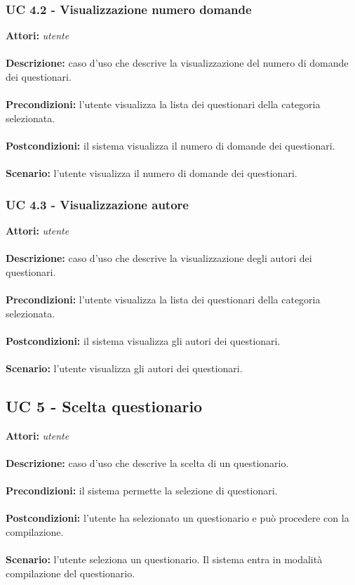 \documentclass[a4paper,11pt]{article}
\begin{document}
\subsubsection{UC 4.2 - Visualizzazione numero domande}

\textbf{Attori:} \textit{utente}
\\ \\
\textbf{Descrizione:} caso d'uso che descrive la visualizzazione del numero di domande dei questionari.\\
\\
\textbf{Precondizioni:} l'utente visualizza la lista dei questionari della categoria selezionata.\\
\\
\textbf{Postcondizioni:} il sistema visualizza il numero di domande dei questionari.\\
\\
\textbf{Scenario:} l’utente visualizza il numero di domande dei questionari.\\


\subsubsection{UC 4.3 - Visualizzazione autore}

\textbf{Attori:} \textit{utente}
\\ \\
\textbf{Descrizione:} caso d'uso che descrive la visualizzazione degli autori dei questionari.\\
\\
\textbf{Precondizioni:} l'utente visualizza la lista dei questionari della categoria selezionata.\\
\\
\textbf{Postcondizioni:} il sistema visualizza gli autori dei questionari.\\
\\
\textbf{Scenario:} l’utente visualizza gli autori dei questionari.\\


\subsection{UC 5 - Scelta questionario}

\textbf{Attori:} \textit{utente}
\\ \\
\textbf{Descrizione:} caso d'uso che descrive la scelta di un questionario.\\
\\
\textbf{Precondizioni:} il sistema permette la selezione di questionari.\\
\\
\textbf{Postcondizioni:} l’utente ha selezionato un questionario e può procedere con la compilazione.\\
\\
\textbf{Scenario:} l’utente seleziona un questionario. Il sistema entra in modalità compilazione del questionario.\\
\end{document}
